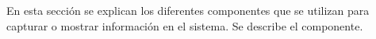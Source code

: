 En esta sección se explican los diferentes componentes que se utilizan para capturar o mostrar
información en el sistema.
Se describe el componente.
